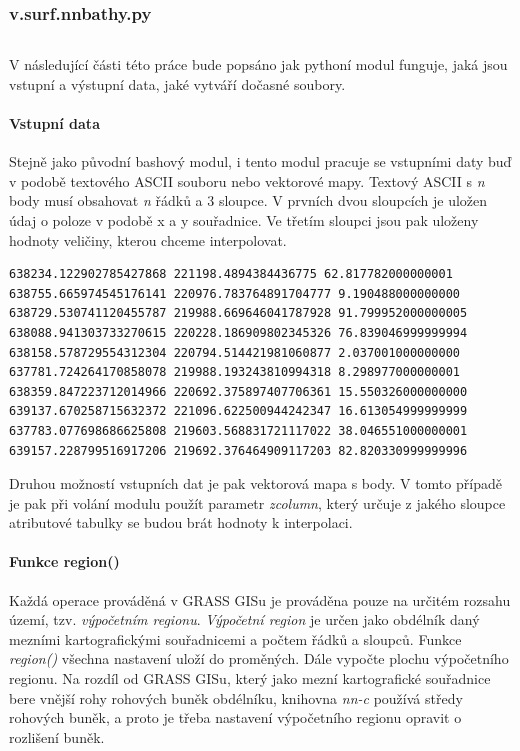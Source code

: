 \documentclass[12pt,a4paper]{article}
\begin{document}
\subsubsection{v.surf.nnbathy.py}
\begin{lstlisting}
\end{lstlisting}

V následující části této práce bude popsáno jak pythoní modul funguje, jaká jsou vstupní a výstupní data, jaké vytváří dočasné soubory.

\paragraph{Vstupní data}
Stejně jako původní bashový modul, i tento modul pracuje se vstupními daty buď v podobě textového ASCII souboru nebo vektorové mapy. Textový ASCII s \textit{n} body musí obsahovat \textit{n} řádků a 3 sloupce. V prvních dvou sloupcích je uložen údaj o poloze v podobě x a y souřadnice. Ve třetím sloupci jsou pak uloženy hodnoty veličiny, kterou chceme interpolovat.

\begin{lstlisting}
638234.122902785427868 221198.4894384436775 62.817782000000001
638755.665974545176141 220976.783764891704777 9.190488000000000
638729.530741120455787 219988.669646041787928 91.799952000000005
638088.941303733270615 220228.186909802345326 76.839046999999994
638158.578729554312304 220794.514421981060877 2.037001000000000
637781.724264170858078 219988.193243810994318 8.298977000000001
638359.847223712014966 220692.375897407706361 15.550326000000000
639137.670258715632372 221096.622500944242347 16.613054999999999
637783.077698686625808 219603.568831721117022 38.046551000000001
639157.228799516917206 219692.376464909117203 82.820330999999996
\end{lstlisting}

Druhou možností vstupních dat je pak vektorová mapa s body. V tomto případě je pak při volání modulu použít parametr \textit{zcolumn}, který určuje z jakého sloupce atributové tabulky se budou brát hodnoty k interpolaci.


\paragraph{Funkce region()}
Každá operace prováděná v GRASS GISu je prováděna pouze na určitém rozsahu území, tzv. \textit{výpočetním regionu}. \textit{Výpočetní region} je určen jako obdélník daný mezními kartografickými souřadnicemi a počtem řádků a sloupců. 
Funkce \textit{region()} všechna nastavení uloží do proměných. Dále vypočte plochu výpočetního regionu. Na rozdíl od GRASS GISu, který jako mezní kartografické souřadnice bere vnější rohy rohových buněk obdélníku, knihovna \textit{nn-c} používá středy rohových buněk, a proto je třeba nastavení výpočetního regionu opravit o rozlišení buněk.
\end{document}
